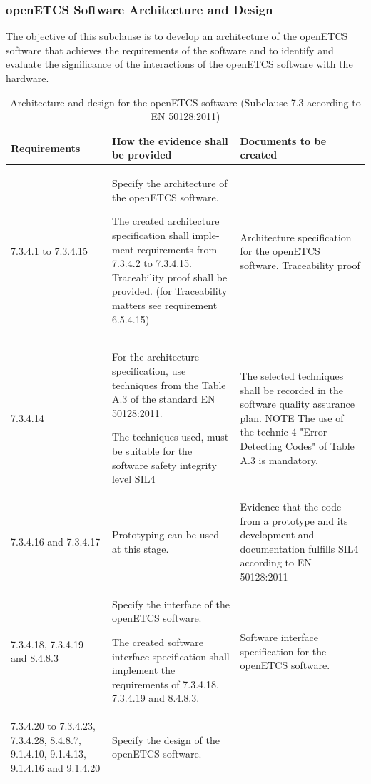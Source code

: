 \documentclass{template/openetcs_report}
\begin{document}
\subsubsection{openETCS Software Architecture and Design}
\begin{flushleft}
The objective of this subclause is to develop an architecture of the openETCS software that achieves the requirements of the software and to identify and evaluate the significance of the interactions of the openETCS software with the hardware.
\end{flushleft}
{\footnotesize\sffamily\centering
\begin{longtable}{|p{2cm}|p{9cm}|p{3cm}|}
\caption{Architecture and design for the openETCS software (Subclause 7.3 according to EN 50128:2011)}\\
\hline
\bfseries Requirements & \bfseries How the evidence shall be provided & \bfseries Documents to be created\\
\hline
\hline
\endhead
\hline
\endfoot

7.3.4.1 to 7.3.4.15 & Specify the architecture of the openETCS software.

The created architecture specification shall imple-ment requirements from 7.3.4.2 to 7.3.4.15.
\linebreak
\linebreak
Traceability proof shall be provided. (for Traceability matters see requirement 6.5.4.15)
& Architecture specification for the openETCS software.
Traceability proof\\ 
\hline
7.3.4.14 & For the architecture specification, use techniques from the Table A.3 of the standard EN 50128:2011.

The techniques used, must be suitable for the software safety integrity level SIL4
& The selected techniques shall be recorded in the software quality assurance plan.
\linebreak
\linebreak
NOTE\linebreak
The use of the technic 4 "Error Detecting Codes" of Table A.3 is mandatory.\\ 
\hline
7.3.4.16 and 7.3.4.17 & Prototyping can be used at this stage.
& Evidence that the code from a prototype and its development and documentation fulfills SIL4 according to EN 50128:2011\\ 
\hline
7.3.4.18, 7.3.4.19 and 8.4.8.3 & Specify the interface of the openETCS software.
 
The created software interface specification shall implement the requirements of 7.3.4.18, 7.3.4.19 and 8.4.8.3.
& Software interface specification for the openETCS software.\\ 
\hline
7.3.4.20 to 7.3.4.23, 7.3.4.28, 8.4.8.7, 9.1.4.10, 9.1.4.13, 9.1.4.16 and 9.1.4.20
& Specify the design of the openETCS software.


\end{longtable}}
\end{document}
